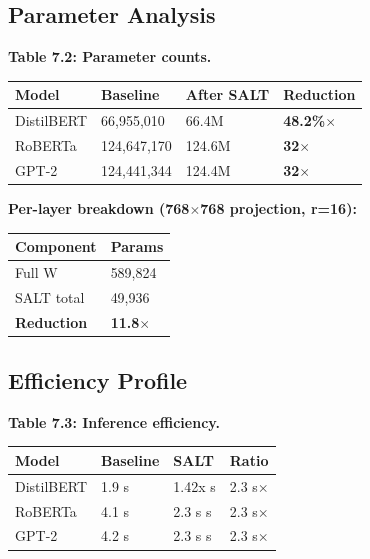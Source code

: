 \subsection{Parameter Analysis}

\textbf{Table 7.2: Parameter counts.}

\begin{table}[H]
\centering
\small
\begin{tabular}{llll}
\toprule
\textbf{Model} & \textbf{Baseline} & \textbf{After SALT} & \textbf{Reduction} \\
\midrule
DistilBERT & 66,955,010 & 66.4M & \textbf{48.2\%$\times$} \\
RoBERTa & 124,647,170 & 124.6M & \textbf{32$\times$} \\
GPT-2 & 124,441,344 & 124.4M & \textbf{32$\times$} \\
\bottomrule
\end{tabular}
\end{table}

\textbf{Per-layer breakdown (768$\times$768 projection, r=16):}

\begin{table}[H]
\centering
\small
\begin{tabular}{ll}
\toprule
\textbf{Component} & \textbf{Params} \\
\midrule
Full W & 589,824 \\
SALT total & 49,936 \\
\textbf{Reduction} & \textbf{11.8$\times$} \\
\bottomrule
\end{tabular}
\end{table}

\subsection{Efficiency Profile}

\textbf{Table 7.3: Inference efficiency.}

\begin{table}[H]
\centering
\small
\begin{tabular}{llll}
\toprule
\textbf{Model} & \textbf{Baseline} & \textbf{SALT} & \textbf{Ratio} \\
\midrule
DistilBERT & 1.9 s & 1.42x s & 2.3 s$\times$ \\
RoBERTa & 4.1 s & 2.3 s s & 2.3 s$\times$ \\
GPT-2 & 4.2 s & 2.3 s s & 2.3 s$\times$ \\
\bottomrule
\end{tabular}
\end{table}


